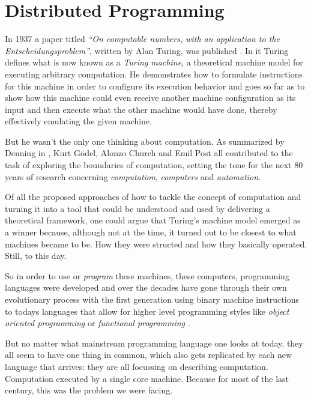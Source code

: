 \section{Distributed Programming}
In 1937 a paper titled \textit{``On computable numbers, with an
application to the Entscheidungsproblem''}, written by Alan Turing, was
published \cite{turingcomputable}. In it Turing defines what is now
known as a \textit{Turing machine}, a theoretical machine model for
executing arbitrary computation. He demonstrates how to formulate
instructions for this machine in order to configure its execution
behavior and goes so far as to show how this
machine could even receive another machine configuration as its input
and then execute what the other machine would have done, thereby
effectively emulating the given machine.
\newline

But he wasn't the only one thinking about computation. As summarized
by Denning in \cite{whatiscomputation}, Kurt Gödel, Alonzo Church and Emil
Post all contributed to the task of exploring the boundaries of
computation, setting the tone for the next 80 years of research
concerning \textit{computation}, \textit{computers} and \textit{automation}.

Of all the proposed approaches of how to tackle the concept of computation
and turning it into a tool that could be understood and used by delivering
a theoretical framework, one could argue that Turing's machine model
emerged as a winner because, although not at the time, it turned out
to be closest to what machines became to be. How they were structed and
how they basically operated. Still, to this day.

So in order to use or \textit{program} these machines, these computers,
programming languages were developed and over the decades have gone
through their own evolutionary process \cite{pl-gens} with the
first generation using binary machine instructions to todays languages
that allow for higher level programming styles like
\textit{object oriented programming } \cite{bjarneOO} or
\textit{functional programming} \cite{wadler-functional}.
\newline

But no matter what mainstream programming language one looks at today,
they all seem to have one thing in common, which also gets replicated
by each new language that arrives: they are all focussing on
describing computation. Computation executed by a single core machine.
Because for most of the last century, this was the problem we were
facing.

